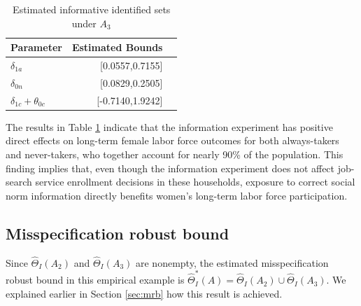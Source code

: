 \documentclass[12pt]{article}
\theoremstyle{plain}
\theoremstyle{definition}
\theoremstyle{remark}
\begin{document}
\begin{table}
    \centering
    \caption{Estimated informative identified sets under $A_3$}
      \begin{tabular}{lrr}
      \toprule
        Parameter    & \multicolumn{1}{c}{Estimated Bounds} \\
      \midrule
      $\delta_{1a}$ \quad \quad \quad \quad & [0.0557,0.7155] \\
      $\delta_{0n}$ \quad \quad \quad \quad & [0.0829,0.2505] \\
      $\delta_{1c}+\theta_{0c}$ \quad \quad \quad \quad& [-0.7140,1.9242] \\
      \bottomrule
      \end{tabular}%
    \label{tab:est_bounds}%
\end{table}%

The results in Table \ref{tab:est_bounds} indicate that the information experiment has positive direct effects on long-term female labor force outcomes for both always-takers and never-takers, who together account for nearly 90\% of the population. This finding implies that, even though the information experiment does not affect job-search service enrollment decisions in these households, exposure to correct social norm information directly benefits women's long-term labor force participation.

\subsection*{Misspecification robust bound} Since $\widehat{\Theta}_I(A_2)$ and $\widehat{\Theta}_I(A_3)$ are nonempty, the estimated misspecification robust bound in this empirical example is $\widehat{\Theta}^*_I(A)=\widehat{\Theta}_I(A_2) \cup \widehat{\Theta}_I(A_3)$. We explained earlier in Section \ref{sec:mrb} how this result is achieved. 
\end{document}
